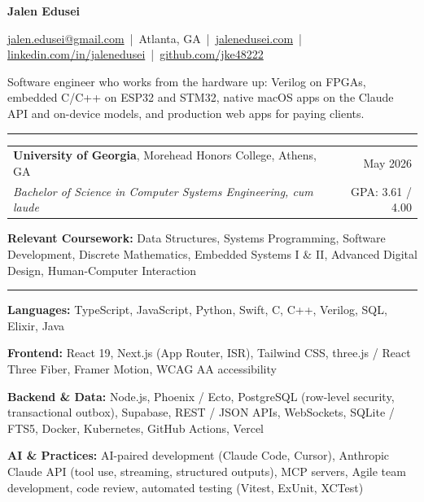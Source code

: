 \documentclass[letterpaper,10pt]{article}
\newcommand{\sectiontitle}[1]{\vspace{4pt}{\textbf{\large #1}}\par\vspace{-6pt}\rule{\textwidth}{0.4pt}\par\vspace{1pt}}
\begin{document}
\begin{center}
{\LARGE \textbf{Jalen Edusei}}\par
\vspace{2pt}
{\small \href{mailto:jalen.edusei@gmail.com}{jalen.edusei@gmail.com} \,|\,
Atlanta, GA \,|\,
\href{https://www.jalenedusei.com}{jalenedusei.com} \,|\,
\href{https://www.linkedin.com/in/jalenedusei}{linkedin.com/in/jalenedusei} \,|\,
\href{https://github.com/jke48222}{github.com/jke48222}}
\end{center}

\vspace{3pt}
{\small Software engineer who works from the hardware up: Verilog on FPGAs, embedded C/C++ on ESP32 and STM32, native macOS apps on the Claude API and on-device models, and production web apps for paying clients.}\par

\sectiontitle{EDUCATION}
\begin{tabularx}{\textwidth}{@{}X r@{}}
\textbf{University of Georgia}, Morehead Honors College, Athens, GA & May 2026 \\
\textit{Bachelor of Science in Computer Systems Engineering, cum laude} & GPA: 3.61 / 4.00 \\
\end{tabularx}
\vspace{1pt}\par
{\small \textbf{Relevant Coursework:} Data Structures, Systems Programming, Software Development, Discrete Mathematics, Embedded Systems I \& II, Advanced Digital Design, Human-Computer Interaction}

\sectiontitle{TECHNICAL SKILLS}
\textbf{Languages:} TypeScript, JavaScript, Python, Swift, C, C++, Verilog, SQL, Elixir, Java\par
\textbf{Frontend:} React 19, Next.js (App Router, ISR), Tailwind CSS, three.js / React Three Fiber, Framer Motion, WCAG AA accessibility\par
\textbf{Backend \& Data:} Node.js, Phoenix / Ecto, PostgreSQL (row-level security, transactional outbox), Supabase, REST / JSON APIs, WebSockets, SQLite / FTS5, Docker, Kubernetes, GitHub Actions, Vercel\par
\textbf{AI \& Practices:} AI-paired development (Claude Code, Cursor), Anthropic Claude API (tool use, streaming, structured outputs), MCP servers, Agile team development, code review, automated testing (Vitest, ExUnit, XCTest)
\end{document}

